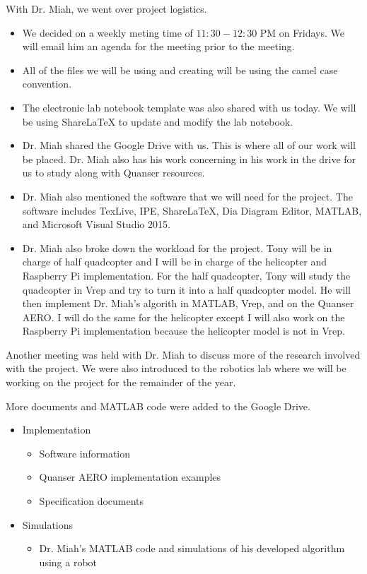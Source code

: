 \documentclass[fontsize=11pt, %
                             paper=letter, %
                             twoside, %
                             captions=tableheading,
                             index=totoc,
                             hyperref]{labbook}
\begin{document}
\begin{addmargin}[0cm]{0cm}
With Dr. Miah, we went over project logistics. 
\begin{itemize}
    \item We decided on a weekly meting time of $11:30-12:30$ PM on Fridays. We will email him an agenda for the meeting prior to the meeting.
    \item All of the files we will be using and creating will be using the camel case convention.
    \item The electronic lab notebook template was also shared with us today. We will be using ShareLaTeX to update and modify the lab notebook.
    \item Dr. Miah shared the Google Drive with us. This is where all of our work will be placed. Dr. Miah also has his work concerning in his work in the drive for us to study along with Quanser resources.
    \item Dr. Miah also mentioned the software that we will need for the project. The software includes TexLive, IPE, ShareLaTeX, Dia Diagram Editor, MATLAB, and Microsoft Visual Studio 2015.
    \item Dr. Miah also broke down the workload for the project. Tony will be in charge of half quadcopter and I will be in charge of the helicopter and Raspberry Pi implementation. For the half quadcopter, Tony will study the quadcopter in Vrep and try to turn it into a half quadcopter model. He will then implement Dr. Miah's algorith in MATLAB, Vrep, and on the Quanser AERO. I will do the same for the helicopter except I will also work on the Raspberry Pi implementation because the helicopter model is not in Vrep.
\end{itemize}
Another meeting was held with Dr. Miah to discuss more of the research involved with the project. We were also introduced to the robotics lab where we will be working on the project for the remainder of the year.

More documents and MATLAB code were added to the Google Drive.
\begin{itemize}
\item Implementation
    \begin{itemize}
        \item Software information
        \item Quanser AERO implementation examples
        \item Specification documents
    \end{itemize}
\item Simulations
    \begin{itemize}
        \item Dr. Miah's MATLAB code and simulations of his developed algorithm using a robot
    \end{itemize}
\end{itemize}


\end{addmargin}
\end{document}

